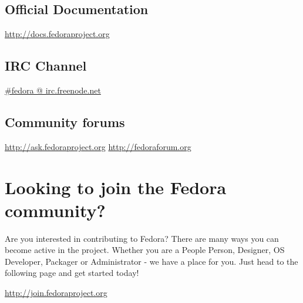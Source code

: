 \documentclass[
notumble,
letterpaper,
10pt
]{leaflet}
\begin{document}
\subsection{Official Documentation}
\href{http://docs.fedoraproject.org}{http://docs.fedoraproject.org}

\subsection{IRC Channel}
\href{http://webchat.freenode.net/?channels=#fedora}{\#fedora @ irc.freenode.net}

\subsection{Community forums}
\href{http://ask.fedoraproject.org}{http://ask.fedoraproject.org}
\href{http://fedoraforum.org}{http://fedoraforum.org}


\section{\textcolor{FedoraBlue}{Looking to join the Fedora community?}}
Are you interested in contributing to Fedora? There are many ways you can become active in the project.  Whether you are a People Person, Designer, OS Developer, Packager or Administrator - we have a place for you. Just head to the following page and get started today!

\begin{center}\href{http://join.fedoraproject.org}{http://join.fedoraproject.org}\end{center}
\end{document}
